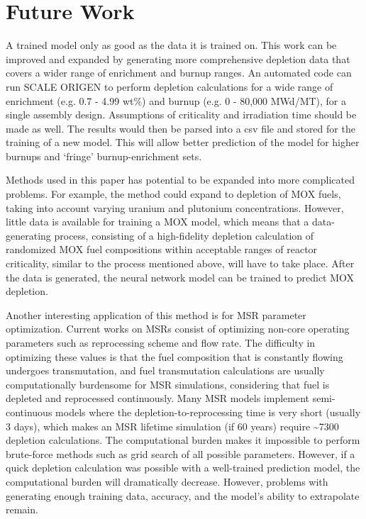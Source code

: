 \section{Future Work}

A trained model only as good as the data it is trained on.
This work can be improved and expanded by generating
more comprehensive depletion data that covers a wider
range of enrichment and burnup ranges. An automated
code can run SCALE ORIGEN to perform depletion calculations
for a wide range of enrichment (e.g. 0.7 - 4.99 wt\%) and burnup (e.g. 0 - 80,000 MWd/MT),
for a single assembly design. Assumptions of criticality
and irradiation time should be made as well. The results
would then be parsed into a csv file and stored for
the training of a new model. This will allow better
prediction of the model for higher burnups and `fringe'
burnup-enrichment sets.

Methods used in this paper has potential to be expanded into more
complicated problems. For example, the method
could expand to depletion of \gls{MOX} fuels, taking
into account varying uranium and plutonium concentrations.
However, little data is available
for training a \gls{MOX} model, which means that a
data-generating process, consisting of a high-fidelity
depletion calculation of randomized \gls{MOX} fuel
compositions within acceptable ranges of reactor
criticality, similar to the process mentioned above,
will have to take place. After the data
is generated, the neural network model can be trained
to predict \gls{MOX} depletion.

Another interesting application of this method is for
\gls{MSR} parameter optimization. Current works on
\glspl{MSR} consist of optimizing non-core operating
parameters such as reprocessing scheme and flow rate.
The difficulty in optimizing these values is that the
fuel composition that is constantly flowing undergoes
transmutation, and fuel transmutation calculations
are usually computationally burdensome for \gls{MSR}
simulations, considering that fuel is depleted and
reprocessed continuously. Many \gls{MSR} models implement semi-continuous
models where the depletion-to-reprocessing time is
very short (usually 3 days), which makes an
\gls{MSR} lifetime simulation (if 60 years)
require \textasciitilde 7300 depletion calculations.
The computational burden
makes it impossible to perform brute-force methods
such as grid search of all possible parameters.
However, if a quick depletion calculation was possible
with a well-trained prediction model, the
computational burden will dramatically decrease.
However, problems with generating enough
training data, accuracy, and the model's ability to
extrapolate remain.